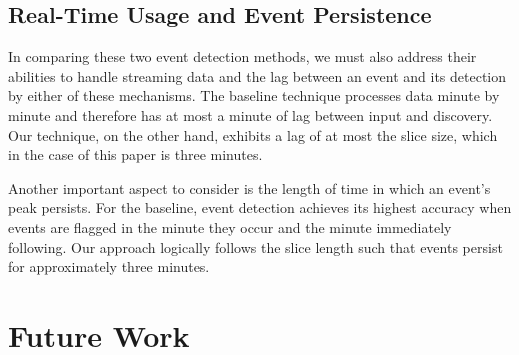 \documentclass{sig-alternate}
\begin{document}
\subsection{Real-Time Usage and Event Persistence}

In comparing these two event detection methods, we must also address their abilities to handle streaming data and the lag between an event and its detection by either of these mechanisms.
The baseline technique processes data minute by minute and therefore has at most a minute of lag between input and discovery.
Our technique, on the other hand, exhibits a lag of at most the slice size, which in the case of this paper is three minutes.

Another important aspect to consider is the length of time in which an event's peak persists.
For the baseline, event detection achieves its highest accuracy when events are flagged in the minute they occur and the minute immediately following.
Our approach logically follows the slice length such that events persist for approximately three minutes.

\section{Future Work}
\label{sect:future}
\end{document}

